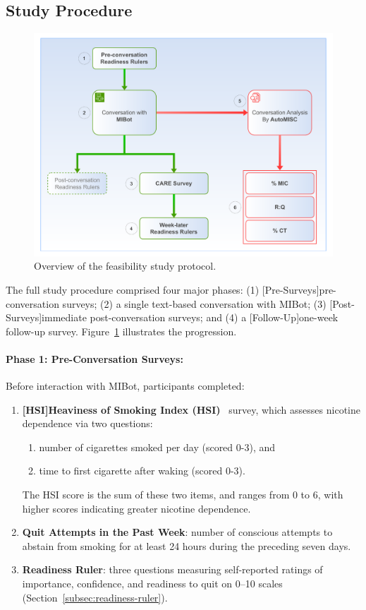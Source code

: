 \subsection{Study Procedure}
\begin{figure}[ht]
    \centering
    \includegraphics[width=0.9\linewidth]{fig/feasibility_study_flow.pdf}
    \caption{Overview of the feasibility study protocol.}
    \label{fig:study-flow}
\end{figure}

The full study procedure comprised four major phases: (1) [Pre-Surveys]pre-conversation surveys; (2) a single text-based conversation with MIBot; (3) [Post-Surveys]immediate post-conversation surveys; and (4) a [Follow-Up]one-week follow-up survey. Figure~\ref{fig:study-flow} illustrates the progression.



\paragraph{Phase 1: Pre-Conversation Surveys:}
Before interaction with MIBot, participants completed:
\begin{enumerate}
    \item \textbf{[HSI]Heaviness of Smoking Index (HSI)}~\citep{heatherton1989measuring} survey, which assesses nicotine dependence via two questions:
        \begin{enumerate}
            \item number of cigarettes smoked per day (scored 0-3), and
            \item time to first cigarette after waking (scored 0-3).
        \end{enumerate}
    The HSI score is the sum of these two items, and ranges from 0 to 6, with higher scores indicating greater nicotine dependence.
    \item \textbf{Quit Attempts in the Past Week}: number of conscious attempts to abstain from smoking for at least 24 hours during the preceding seven days.
    \item \textbf{Readiness Ruler}: three questions measuring self-reported ratings of importance, confidence, and readiness to quit on 0–10 scales (Section~\ref{subsec:readiness-ruler}).
\end{enumerate}

